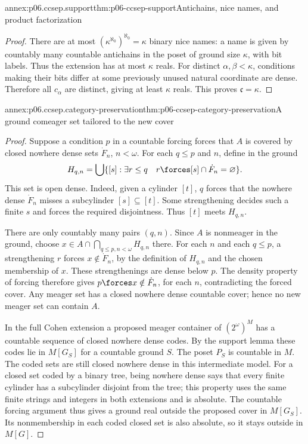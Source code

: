 \begin{annexitem}{annex:p06.ccsep.support}{thm:p06-ccsep-support}{Antichains, nice names, and product factorization}
\begin{proof}
There are at most \((\kappa^{\aleph_0})^{\aleph_0}=\kappa\)
binary nice names: a name is given by countably many countable
antichains in the poset of ground size \(\kappa\), with bit labels.
Thus the extension has at most \(\kappa\) reals. For distinct
\(\alpha,\beta<\kappa\), conditions making their bits differ at
some previously unused natural coordinate are dense. Therefore all
\(c_\alpha\) are distinct, giving at least \(\kappa\) reals.
This proves \(\mathfrak c=\kappa\).
\end{proof}
\end{annexitem}

\begin{annexitem}{annex:p06.ccsep.category-preservation}{thm:p06-ccsep-category-preservation}{A ground comeager set tailored to the new cover}
\begin{proof}
Suppose a condition \(p\) in a countable forcing forces that
\(A\) is covered by closed nowhere dense sets \(\dot F_n\),
\(n<\omega\). For each \(q\leq p\) and \(n\), define in
the ground
\[
 H_{q,n}=\bigcup\{[s]:\exists r\leq q\quad
                   r\forces [s]\cap\dot F_n=\varnothing\}.
\]
This set is open dense. Indeed, given a cylinder \([t]\), \(q\)
forces that the nowhere dense \(\dot F_n\) misses a subcylinder
\([s]\subseteq[t]\). Some strengthening decides such a finite
\(s\) and forces the required disjointness. Thus \([t]\) meets
\(H_{q,n}\).

There are only countably many pairs \((q,n)\). Since \(A\) is
nonmeager in the ground, choose
\(x\in A\cap\bigcap_{q\leq p,n<\omega}H_{q,n}\) there.
For each \(n\) and each \(q\leq p\), a strengthening \(r\)
forces \(x\notin\dot F_n\), by the definition of \(H_{q,n}\)
and the chosen membership of \(x\). These strengthenings are
dense below \(p\). The density property of forcing therefore gives
\(p\forces x\notin\dot F_n\), for each \(n\), contradicting
the forced cover. Any meager set has a closed nowhere dense
countable cover; hence no new meager set can contain \(A\).

In the full Cohen extension a proposed meager container of
\((2^\omega)^M\) has a countable sequence of closed nowhere dense
codes. By the support lemma these codes lie in \(M[G_S]\) for
a countable ground \(S\). The poset \(P_S\) is countable in
\(M\). The coded sets are still closed nowhere dense in this
intermediate model. For a closed set coded by a binary tree, being
nowhere dense says that every finite cylinder has a subcylinder
disjoint from the tree; this property uses the same finite strings
and integers in both extensions and is absolute. The countable
forcing argument thus gives a ground real outside the proposed
cover in \(M[G_S]\). Its nonmembership in each coded closed set
is also absolute, so it stays outside in \(M[G]\).


\end{proof}
\end{annexitem}
